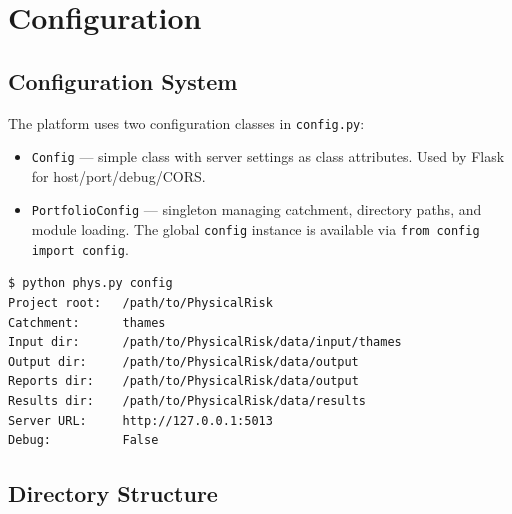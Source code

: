\documentclass[11pt,a4paper]{article}
\begin{document}
\section{Configuration}

\subsection{Configuration System}

The platform uses two configuration classes in \texttt{config.py}:

\begin{itemize}[nosep]
    \item \texttt{Config} --- simple class with server settings as class
          attributes. Used by Flask for host/port/debug/CORS.
    \item \texttt{PortfolioConfig} --- singleton managing catchment, directory
          paths, and module loading. The global \texttt{config} instance is
          available via \texttt{from config import config}.
\end{itemize}

\begin{lstlisting}[language=bash,caption={View current configuration}]
$ python phys.py config
Project root:   /path/to/PhysicalRisk
Catchment:      thames
Input dir:      /path/to/PhysicalRisk/data/input/thames
Output dir:     /path/to/PhysicalRisk/data/output
Reports dir:    /path/to/PhysicalRisk/data/output
Results dir:    /path/to/PhysicalRisk/data/results
Server URL:     http://127.0.0.1:5013
Debug:          False
\end{lstlisting}

\subsection{Directory Structure}
\end{document}
